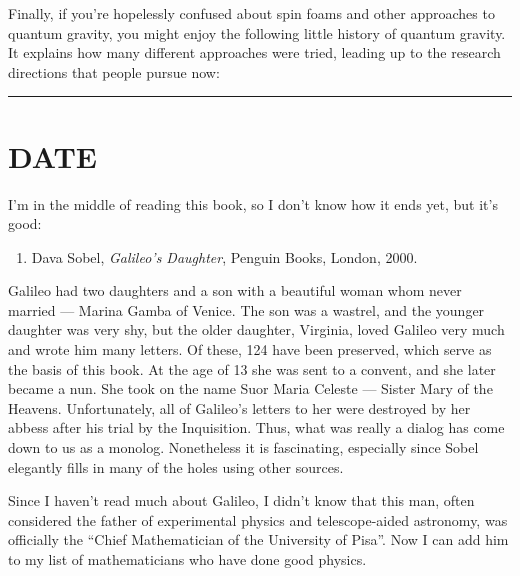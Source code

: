 \documentclass{article}
\def\tightlist{}
\renewcommand{\texttt}[1]{%
  \begingroup
  \ttfamily
  \begingroup\lccode`~=`/\lowercase{\endgroup\def~}{/\discretionary{}{}{}}%
  \begingroup\lccode`~=`[\lowercase{\endgroup\def~}{[\discretionary{}{}{}}%
  \begingroup\lccode`~=`.\lowercase{\endgroup\def~}{.\discretionary{}{}{}}%
  \catcode`/=\active\catcode`[=\active\catcode`.=\active
  \scantokens{#1\noexpand}%
  \endgroup
}
\begin{document}
Finally, if you're hopelessly confused about spin foams and other
approaches to quantum gravity, you might enjoy the following little
history of quantum gravity. It explains how many different approaches
were tried, leading up to the research directions that people pursue
now:


\begin{center}\rule{0.5\linewidth}{0.5pt}\end{center}
\hypertarget{week161}{%
\section{DATE}\label{week161}}

I'm in the middle of reading this book, so I don't know how it ends yet,
but it's good:

\begin{enumerate}
\def\labelenumi{\arabic{enumi})}
\tightlist
\item
  Dava Sobel, \emph{Galileo's Daughter}, Penguin Books, London, 2000.
\end{enumerate}

Galileo had two daughters and a son with a beautiful woman whom never
married --- Marina Gamba of Venice. The son was a wastrel, and the
younger daughter was very shy, but the older daughter, Virginia, loved
Galileo very much and wrote him many letters. Of these, 124 have been
preserved, which serve as the basis of this book. At the age of 13 she
was sent to a convent, and she later became a nun. She took on the name
Suor Maria Celeste --- Sister Mary of the Heavens. Unfortunately, all of
Galileo's letters to her were destroyed by her abbess after his trial by
the Inquisition. Thus, what was really a dialog has come down to us as a
monolog. Nonetheless it is fascinating, especially since Sobel elegantly
fills in many of the holes using other sources.

Since I haven't read much about Galileo, I didn't know that this man,
often considered the father of experimental physics and telescope-aided
astronomy, was officially the ``Chief Mathematician of the University of
Pisa''. Now I can add him to my list of mathematicians who have done
good physics.
\end{document}
